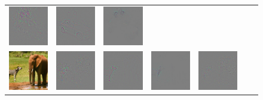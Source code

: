 \begin{figure}
\begin{center}
\begin{tabular}{ccccccc}
\includegraphics[width=0.14\linewidth,height=0.115\linewidth]{figs/examples/googlenet/oxford/bic-car2_diff_672} &
\includegraphics[width=0.14\linewidth,height=0.115\linewidth]{figs/examples/googlenet/deconv/bic-car2_diff_672} &
\includegraphics[width=0.14\linewidth,height=0.115\linewidth]{figs/examples/googlenet/soft/bic-car2_diff_672} \\
\vspace{-2.5pt}
\includegraphics[width=0.14\linewidth,height=0.115\linewidth]{figs/examples/googlenet/oxford/zeb-ele1} &
\includegraphics[width=0.14\linewidth,height=0.115\linewidth]{figs/examples/googlenet/oxford/zeb-ele1_diff_341} &
\includegraphics[width=0.14\linewidth,height=0.115\linewidth]{figs/examples/googlenet/deconv/zeb-ele1_diff_341} &
\includegraphics[width=0.14\linewidth,height=0.115\linewidth]{figs/examples/googlenet/soft/zeb-ele1_diff_341} &
\includegraphics[width=0.14\linewidth,height=0.115\linewidth]{figs/examples/googlenet/oxford/zeb-ele1_diff_387} &

\end{tabular}
\end{center}
\end{figure}
